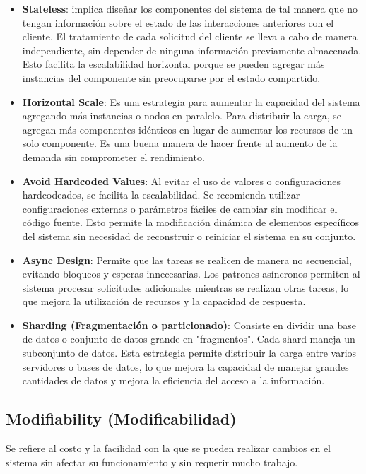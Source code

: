 \documentclass{article}
\begin{document}
		\begin{itemize}		
				\item \textbf{Stateless}: implica diseñar los componentes del sistema de tal manera que no tengan información sobre el estado de las interacciones anteriores con el cliente. El tratamiento de cada solicitud del cliente se lleva a cabo de manera independiente, sin depender de ninguna información previamente almacenada. Esto facilita la escalabilidad horizontal porque se pueden agregar más instancias del componente sin preocuparse por el estado compartido.
				
				\item \textbf{Horizontal Scale}: Es una estrategia para aumentar la capacidad del sistema agregando más instancias o nodos en paralelo. Para distribuir la carga, se agregan más componentes idénticos en lugar de aumentar los recursos de un solo componente. Es una buena manera de hacer frente al aumento de la demanda sin comprometer el rendimiento.
				
				\item \textbf{Avoid Hardcoded Values}: Al evitar el uso de valores o configuraciones hardcodeados, se facilita la escalabilidad. Se recomienda utilizar configuraciones externas o parámetros fáciles de cambiar sin modificar el código fuente. Esto permite la modificación dinámica de elementos específicos del sistema sin necesidad de reconstruir o reiniciar el sistema en su conjunto.
				
				
				\item \textbf{Async Design}: Permite que las tareas se realicen de manera no secuencial, evitando bloqueos y esperas innecesarias. Los patrones asíncronos permiten al sistema procesar solicitudes adicionales mientras se realizan otras tareas, lo que mejora la utilización de recursos y la capacidad de respuesta.
				
				\item \textbf{Sharding (Fragmentación o particionado)}: Consiste en dividir una base de datos o conjunto de datos grande en "fragmentos". Cada shard maneja un subconjunto de datos. Esta estrategia permite distribuir la carga entre varios servidores o bases de datos, lo que mejora la capacidad de manejar grandes cantidades de datos y mejora la eficiencia del acceso a la información.
			
		\end{itemize}
			
		\subsection{Modifiability \small{(Modificabilidad)} }
		Se refiere al costo y la facilidad con la que se pueden realizar cambios en el sistema sin afectar su funcionamiento y sin requerir mucho trabajo.
		 
\end{document}
